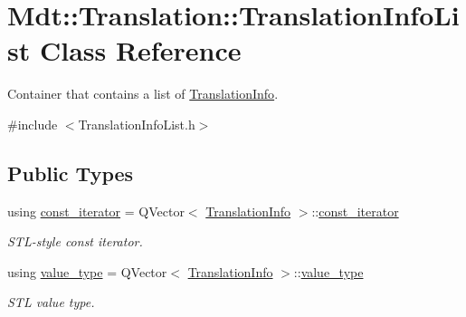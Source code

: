 \hypertarget{class_mdt_1_1_translation_1_1_translation_info_list}{}\section{Mdt\+:\+:Translation\+:\+:Translation\+Info\+List Class Reference}
\label{class_mdt_1_1_translation_1_1_translation_info_list}


Container that contains a list of \hyperlink{class_mdt_1_1_translation_1_1_translation_info}{Translation\+Info}.  




{\ttfamily \#include $<$Translation\+Info\+List.\+h$>$}

\subsection*{Public Types}
\begin{DoxyCompactItemize}
\item 
using \hyperlink{class_mdt_1_1_translation_1_1_translation_info_list_a9e4747d959b7b20fc6e60d62552dc93e}{const\+\_\+iterator} = Q\+Vector$<$ \hyperlink{class_mdt_1_1_translation_1_1_translation_info}{Translation\+Info} $>$\+::\hyperlink{class_mdt_1_1_translation_1_1_translation_info_list_a9e4747d959b7b20fc6e60d62552dc93e}{const\+\_\+iterator}\hypertarget{class_mdt_1_1_translation_1_1_translation_info_list_a9e4747d959b7b20fc6e60d62552dc93e}{}\label{class_mdt_1_1_translation_1_1_translation_info_list_a9e4747d959b7b20fc6e60d62552dc93e}

\begin{DoxyCompactList}\small\item\em S\+T\+L-\/style const iterator. \end{DoxyCompactList}\item 
using \hyperlink{class_mdt_1_1_translation_1_1_translation_info_list_a979ffbfae09ae98963a9ad35c6318456}{value\+\_\+type} = Q\+Vector$<$ \hyperlink{class_mdt_1_1_translation_1_1_translation_info}{Translation\+Info} $>$\+::\hyperlink{class_mdt_1_1_translation_1_1_translation_info_list_a979ffbfae09ae98963a9ad35c6318456}{value\+\_\+type}\hypertarget{class_mdt_1_1_translation_1_1_translation_info_list_a979ffbfae09ae98963a9ad35c6318456}{}\label{class_mdt_1_1_translation_1_1_translation_info_list_a979ffbfae09ae98963a9ad35c6318456}

\begin{DoxyCompactList}\small\item\em S\+TL value type. \end{DoxyCompactList}\end{DoxyCompactItemize}
